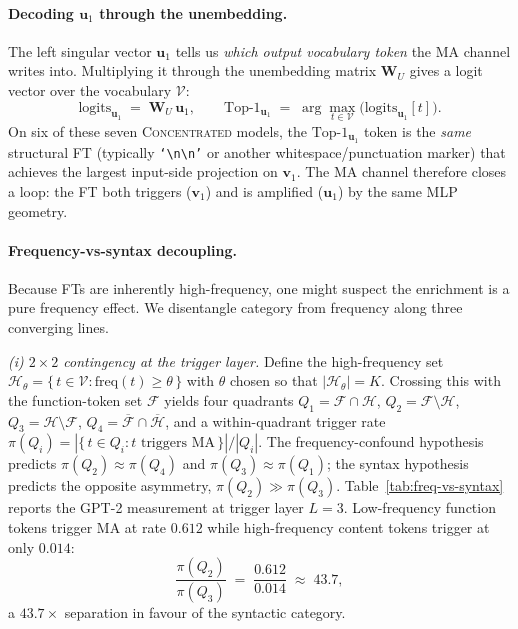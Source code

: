 \documentclass{article}
\begin{document}
\paragraph{Decoding $\mathbf{u}_1$ through the unembedding.}
The left singular vector $\mathbf{u}_1$ tells us \emph{which output
vocabulary token} the MA channel writes into. Multiplying it through the
unembedding matrix $\mathbf{W}_U$ gives a logit vector over the vocabulary
$\mathcal{V}$:
\begin{equation}
  \label{eq:u1-decode}
  \text{logits}_{\mathbf{u}_1} \;=\; \mathbf{W}_U\,\mathbf{u}_1,
  \qquad \mathrm{Top}\text{-}1_{\mathbf{u}_1} \;=\; \arg\max_{t \in \mathcal{V}} \bigl(\text{logits}_{\mathbf{u}_1}[t]\bigr).
\end{equation}
On six of these seven \textsc{Concentrated} models, the
$\mathrm{Top}\text{-}1_{\mathbf{u}_1}$ token is the \emph{same} structural
FT (typically \texttt{`\textbackslash n\textbackslash n'} or another
whitespace/punctuation marker) that achieves the largest input-side
projection on $\mathbf{v}_1$. The MA channel therefore closes a loop:
the FT both triggers ($\mathbf{v}_1$) and is amplified ($\mathbf{u}_1$) by
the same MLP geometry.

\paragraph{Frequency-vs-syntax decoupling.}
\label{sec:freq-vs-syntax}
Because FTs are inherently high-frequency, one might suspect the
enrichment is a pure frequency effect. We disentangle category from
frequency along three converging lines.

\emph{(i) $2\!\times\!2$ contingency at the trigger layer.}
Define the high-frequency set
$\mathcal{H}_{\theta} = \{\,t \in \mathcal{V}: \mathrm{freq}(t) \geq \theta\,\}$
with $\theta$ chosen so that $|\mathcal{H}_{\theta}| = K$. Crossing this
with the function-token set $\mathcal{F}$ yields four quadrants
$Q_1{=}\mathcal{F}\cap\mathcal{H}$,
$Q_2{=}\mathcal{F}\setminus\mathcal{H}$,
$Q_3{=}\mathcal{H}\setminus\mathcal{F}$,
$Q_4{=}\overline{\mathcal{F}}\cap\overline{\mathcal{H}}$, and a
within-quadrant trigger rate
$\pi(Q_i) = |\{\,t\in Q_i : t \text{ triggers MA}\,\}| / |Q_i|$.
The frequency-confound hypothesis predicts
$\pi(Q_2) \!\approx\! \pi(Q_4)$ and $\pi(Q_3) \!\approx\! \pi(Q_1)$;
the syntax hypothesis predicts the opposite asymmetry,
$\pi(Q_2)\!\gg\!\pi(Q_3)$. Table~\ref{tab:freq-vs-syntax} reports the
GPT-2 measurement at trigger layer $L{=}3$. Low-frequency function
tokens trigger MA at rate $0.612$ while high-frequency content tokens
trigger at only $0.014$:
\begin{equation}
  \label{eq:freq-vs-syntax-ratio}
  \frac{\pi(Q_2)}{\pi(Q_3)} \;=\; \frac{0.612}{0.014} \;\approx\; 43.7,
\end{equation}
a $43.7\!\times$ separation in favour of the syntactic category.
\end{document}
